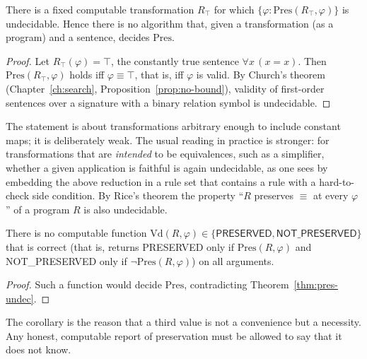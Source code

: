 \begin{theorem}
\label{thm:pres-undec}
There is a fixed computable transformation $R_\top$ for which $\{\varphi:\mathrm{Pres}(R_\top,\varphi)\}$ is undecidable. Hence there is no algorithm that, given a transformation (as a program) and a sentence, decides $\mathrm{Pres}$.
\end{theorem}

\begin{proof}
Let $R_\top(\varphi)=\top$, the constantly true sentence $\forall x\,(x=x)$. Then $\mathrm{Pres}(R_\top,\varphi)$ holds iff $\varphi\equiv\top$, that is, iff $\varphi$ is valid. By Church's theorem (Chapter~\ref{ch:search}, Proposition~\ref{prop:no-bound}), validity of first-order sentences over a signature with a binary relation symbol is undecidable.
\end{proof}

\begin{remark}
The statement is about transformations arbitrary enough to include constant maps; it is deliberately weak. The usual reading in practice is stronger: for transformations that are \emph{intended} to be equivalences, such as a simplifier, whether a given application is faithful is again undecidable, as one sees by embedding the above reduction in a rule set that contains a rule with a hard-to-check side condition. By Rice's theorem  the property ``$R$ preserves $\equiv$ at every $\varphi$'' of a program $R$ is also undecidable.
\end{remark}

\begin{corollary}
\label{cor:no-total}
There is no computable function $\mathrm{Vd}(R,\varphi)\in\{\textsf{PRESERVED},\textsf{NOT\_PRESERVED}\}$ that is correct (that is, returns \textsf{PRESERVED} only if $\mathrm{Pres}(R,\varphi)$ and \textsf{NOT\_PRESERVED} only if $\neg\mathrm{Pres}(R,\varphi)$) on all arguments.
\end{corollary}

\begin{proof}
Such a function would decide $\mathrm{Pres}$, contradicting Theorem~\ref{thm:pres-undec}.
\end{proof}

The corollary is the reason that a third value is not a convenience but a necessity. Any honest, computable report of preservation must be allowed to say that it does not know.

